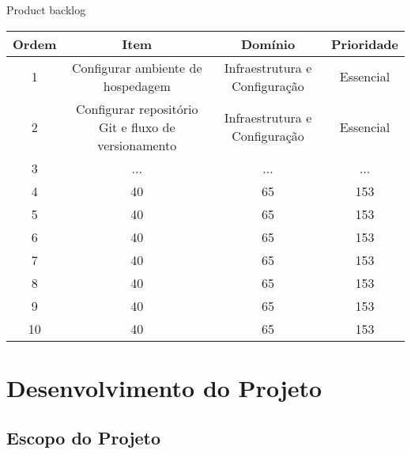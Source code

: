\documentclass[
	12pt,				%
	openany,			%
	twoside,			%
	a4paper,			%
	english,			%
	french,				%
	spanish,			%
	brazil				%
	]{abntex2}
\begin{document}
\begin{quadro}[htb]
	\caption{Product backlog}
	\label{quadro_product_backlog}
	\begin{tabular}{|c|c|c|c|}
		\hline
		\textbf{Ordem} & \textbf{Item} & \textbf{Domínio} & \textbf{Prioridade} \\ \hline
		1 & Configurar ambiente de hospedagem & Infraestrutura e Configuração   & Essencial    \\ \hline
		2 & Configurar repositório Git e fluxo de versionamento & Infraestrutura e Configuração & Essencial  \\ \hline
		3 & ...   & ...  & ...    \\ \hline
		4 & 40    & 65   & 153    \\ \hline
		5 & 40    & 65   & 153    \\ \hline
		6 & 40    & 65   & 153    \\ \hline
		7 & 40    & 65   & 153    \\ \hline
		8 & 40    & 65   & 153    \\ \hline
		9 & 40    & 65   & 153    \\ \hline
		10 & 40    & 65   & 153    \\ \hline
	\end{tabular}
\end{quadro}


\chapter{Desenvolvimento do Projeto}
\section{Escopo do Projeto}
\end{document}
